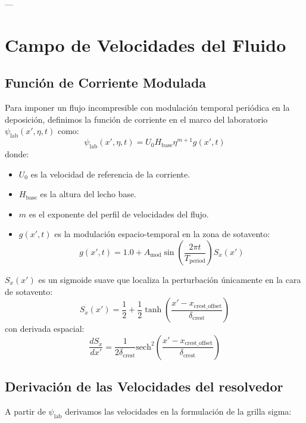\documentclass[11pt,a4paper]{article}
\begin{document}
---

\section{Campo de Velocidades del Fluido}

\subsection{Función de Corriente Modulada}
Para imponer un flujo incompresible con modulación temporal periódica en la deposición, definimos la función de corriente en el marco del laboratorio $\psi_{\text{lab}}(x', \eta, t)$ como:
\begin{equation}
\psi_{\text{lab}}(x', \eta, t) = U_0 H_{\text{base}} \eta^{m+1} g(x', t)
\end{equation}
donde:
\begin{itemize}
    \item $U_0$ es la velocidad de referencia de la corriente.
    \item $H_{\text{base}}$ es la altura del lecho base.
    \item $m$ es el exponente del perfil de velocidades del flujo.
    \item $g(x', t)$ es la modulación espacio-temporal en la zona de sotavento:
    \begin{equation}
    g(x', t) = 1.0 + A_{\text{mod}} \sin\left(\frac{2\pi t}{T_{\text{period}}}\right) S_x(x')
    \end{equation}
\end{itemize}
$S_x(x')$ es un sigmoide suave que localiza la perturbación únicamente en la cara de sotavento:
\begin{equation}
S_x(x') = \frac{1}{2} + \frac{1}{2} \tanh\left(\frac{x' - x_{\text{crest\_offset}}}{\delta_{\text{crest}}}\right)
\end{equation}
con derivada espacial:
\begin{equation}
\frac{dS_x}{dx'} = \frac{1}{2\delta_{\text{crest}}} \text{sech}^2\left(\frac{x' - x_{\text{crest\_offset}}}{\delta_{\text{crest}}}\right)
\end{equation}

\subsection{Derivación de las Velocidades del resolvedor}
A partir de $\psi_{\text{lab}}$ derivamos las velocidades en la formulación de la grilla sigma:
\end{document}
